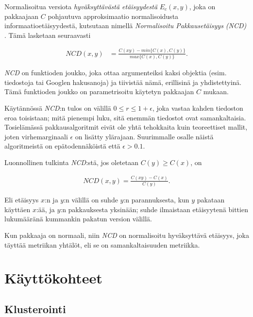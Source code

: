 \documentclass[12pt,finnish,draft]{tktltiki2}
\theoremstyle{definition}
\theoremstyle{remark}
\begin{document}
  Normalisoitua versiota \emph{hyväksyttävästä etäisyydestä} $E_c(x,y)$, joka on pakkaajaan $C$ pohjautuva approksimaatio normalisoidusta informaatioetäisyydestä, kutsutaan nimellä \emph{Normalisoitu Pakkausetäisyys (NCD)} \cite{CV05}. Tämä lasketaan seuraavasti

  \begin{align}
    NCD(x,y) &= \frac{C(xy)-min\{C(x),C(y)\}}{max\{C(x),C(y)\}}.
  \end{align}

  \emph{NCD} on funktioden joukko, joka ottaa argumenteiksi kaksi objektia (esim. tiedostoja tai Googlen hakusanoja) ja tiivistää nämä, erillisinä ja yhdistettyinä. Tämä funktioden joukko on parametrisoitu käytetyn pakkaajan $C$ mukaan.

  Käytännössä \emph{NCD}:n tulos on välillä $0 \leq r \leq 1+ \epsilon$, joka vastaa kahden tiedoston eroa toisistaan; mitä pienempi luku, sitä enemmän tiedostot ovat samankaltaisia. Tosielämässä pakkausalgoritmit eivät ole yhtä tehokkaita kuin teoreettiset mallit, joten virhemarginaali $\epsilon$ on lisätty ylärajaan. Suurimmalle osalle näistä algoritmeistä on epätodennäköistä että  $\epsilon > 0.1$.

  Luonnollinen tulkinta \emph{NCD}:stä, jos oletetaan $C(y) \geq C(x)$, on

  \begin{align}
    NCD(x,y) = \frac{C(xy)-C(x)}{C(y)}.
 \end{align}

  Eli etäisyys $x$:n ja $y$:n välillä on suhde $y$:n parannuksesta, kun $y$ pakataan käyttäen $x$:ää, ja $y$:n pakkauksesta yksinään; suhde ilmaistaan etäisyytenä bittien lukumääränä kummankin pakatun version välillä.

  Kun pakkaaja on normaali, niin \emph{NCD} on normalisoitu hyväksyttävä etäisyys, joka täyttää metriikan yhtälöt, eli se on samankaltaisuuden metriikka.



\section{Käyttökohteet} %
\label{sec:k_ytt_kohteet}
  \subsection{Klusterointi} %
  \label{sub:klusterointi}
\end{document}
